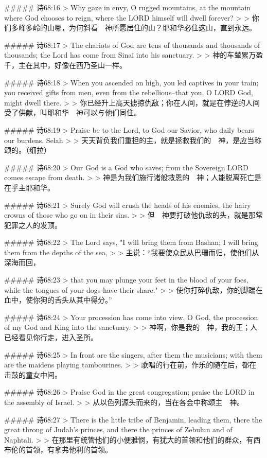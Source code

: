 ##### 诗68:16
> Why gaze in envy, O rugged mountains, at the mountain where God chooses to reign, where the LORD himself will dwell forever?
>
> 你们多峰多岭的山哪，为何斜看　神所愿居住的山？耶和华必住这山，直到永远。


##### 诗68:17
> The chariots of God are tens of thousands and thousands of thousands; the Lord has come from Sinai into his sanctuary.
>
> 神的车辇累万盈千，主在其中，好像在西乃圣山一样。


##### 诗68:18
> When you ascended on high, you led captives in your train; you received gifts from men, even from the rebellious--that you, O LORD God, might dwell there.
>
> 你已经升上高天掳掠仇敌；你在人间，就是在悖逆的人间受了供献，叫耶和华　神可以与他们同住。


##### 诗68:19
> Praise be to the Lord, to God our Savior, who daily bears our burdens. Selah
>
> 天天背负我们重担的主，就是拯救我们的　神，是应当称颂的。（细拉）


##### 诗68:20
> Our God is a God who saves; from the Sovereign LORD comes escape from death.
>
> 神是为我们施行诸般救恩的　神；人能脱离死亡是在乎主耶和华。


##### 诗68:21
> Surely God will crush the heads of his enemies, the hairy crowns of those who go on in their sins.
>
> 但　神要打破他仇敌的头，就是那常犯罪之人的发顶。


##### 诗68:22
> The Lord says, "I will bring them from Bashan; I will bring them from the depths of the sea,
>
> 主说：“我要使众民从巴珊而归，使他们从深海而回，


##### 诗68:23
> that you may plunge your feet in the blood of your foes, while the tongues of your dogs have their share."
>
> 使你打碎仇敌，你的脚踹在血中，使你狗的舌头从其中得分。”


##### 诗68:24
> Your procession has come into view, O God, the procession of my God and King into the sanctuary.
>
> 神啊，你是我的　神，我的王；人已经看见你行走，进入圣所。


##### 诗68:25
> In front are the singers, after them the musicians; with them are the maidens playing tambourines.
>
> 歌唱的行在前，作乐的随在后，都在击鼓的童女中间。


##### 诗68:26
> Praise God in the great congregation; praise the LORD in the assembly of Israel.
>
> 从以色列源头而来的，当在各会中称颂主　神。


##### 诗68:27
> There is the little tribe of Benjamin, leading them, there the great throng of Judah's princes, and there the princes of Zebulun and of Naphtali.
>
> 在那里有统管他们的小便雅悯，有犹大的首领和他们的群众，有西布伦的首领，有拿弗他利的首领。


